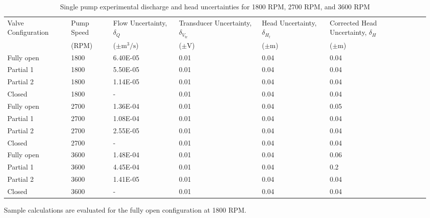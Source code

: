 \begin{table}[H]
    \centering
    \caption{Single pump experimental discharge and head uncertainties for 1800 RPM, 2700 RPM, and 3600 RPM}
    \label{tab:single_pump_discharge_and_head_uncertainty}
    \begin{tabular}{lC{0.15\textwidth}C{0.10\textwidth}C{0.10\textwidth}C{0.10\textwidth}C{0.15\textwidth}C{0.10\textwidth}}
        \toprule
        Valve Configuration & Pump Speed & Flow Uncertainty, $\delta_Q$ & Transducer Uncertainty, $\delta_{V_{\text{tr}}}$ & Head Uncertainty, $\delta_{H_t}$ & Corrected Head Uncertainty, $\delta_{H}$ \\
        & (RPM) & ($\pm\unit{\meter\cubed\per\second}$) & ($\pm$V) & ($\pm$m) & ($\pm$m) \\
        \midrule
        Fully open & 1800 & 6.40E-05 & 0.01 & 0.04 & 0.04 \\
        Partial 1 & 1800 & 5.50E-05 & 0.01 & 0.04 & 0.04 \\
        Partial 2 & 1800 & 1.14E-05 & 0.01 & 0.04 & 0.04 \\
        Closed & 1800 & - & 0.01 & 0.04 & 0.04 \\
        Fully open & 2700 & 1.36E-04 & 0.01 & 0.04 & 0.05 \\
        Partial 1 & 2700 & 1.08E-04 & 0.01 & 0.04 & 0.04 \\
        Partial 2 & 2700 & 2.55E-05 & 0.01 & 0.04 & 0.04 \\
        Closed & 2700 & - & 0.01 & 0.04 & 0.04 \\
        Fully open & 3600 & 1.48E-04 & 0.01 & 0.04 & 0.06 \\
        Partial 1 & 3600 & 4.45E-04 & 0.01 & 0.04 & 0.2 \\
        Partial 2 & 3600 & 1.41E-05 & 0.01 & 0.04 & 0.04 \\
        Closed & 3600 & - & 0.01 & 0.04 & 0.04 \\
        \bottomrule
    \end{tabular}
\end{table}
Sample calculations are evaluated for the fully open configuration at 1800 RPM.

